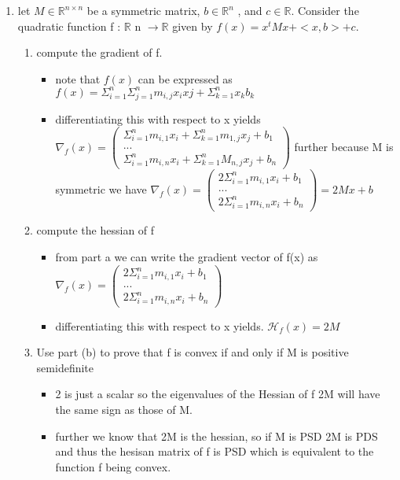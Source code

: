 \documentclass[12pt,twoside]{article}
\begin{document}
\begin{enumerate}[label=9.2]
\item let $M \in\mathbb{R}^{n×n}$
be a symmetric matrix, $b\in\mathbb{R}^{n}$
, and $c\in\mathbb{R}$. Consider
the quadratic function f : $\mathbb{R}$
n $\rightarrow \mathbb{R}$ given by
$f(x) = x^t
Mx + <x,b> + c$.
\begin{enumerate}
    \item compute the gradient of f. 
    \begin{itemize}
        \item note that $f(x)$ can be expressed as $f(x)=\Sigma_{i=1}^{n}\Sigma_{j=1}^{n}m_{i,j}x_{i}x{j}+\Sigma_{k=1}^{n}x_kb_k$
        \item differentiating this with respect to x yields $\nabla_f(x)=\begin{pmatrix}\Sigma_{i=1}^{n}m_{i,1}x_i+\Sigma_{k=1}^{n}m_{1,j}x_j+b_1\\...\\\Sigma_{i=1}^{n}m_{i,n}x_i+\Sigma_{k=1}^{n}M_{n,j}x_j+b_n 
        \end{pmatrix}$ further because M is symmetric we have $\nabla_f(x)=\begin{pmatrix}2\Sigma_{i=1}^{n}m_{i,1}x_i+b_1\\...\\2\Sigma_{i=1}^{n}m_{i,n}x_i+b_n 
        \end{pmatrix}=2Mx+b$
    \end{itemize}
    \item compute the hessian of f 
        \begin{itemize}
        \item from part a we can write the gradient vector of f(x) as  $\nabla_f(x)=\begin{pmatrix}2\Sigma_{i=1}^{n}m_{i,1}x_i+b_1\\...\\2\Sigma_{i=1}^{n}m_{i,n}x_i+b_n 
        \end{pmatrix}$ 
        \item differentiating this with respect to x yields. $\mathcal{H}_{f}(x)=2M$
    \end{itemize}
    \item  Use part (b) to prove that f is convex if and only if M is positive semidefinite
        \begin{itemize}
        \item 2 is just a scalar so the eigenvalues of the Hessian of f 2M will have the same sign as those of M. 
        \item further we know that 2M is the hessian, so if M is PSD 2M is PDS and thus the hesisan matrix of f is PSD which is equivalent to the function f being convex. 

\end{itemize}
\end{enumerate}
\end{enumerate}
\end{document}

